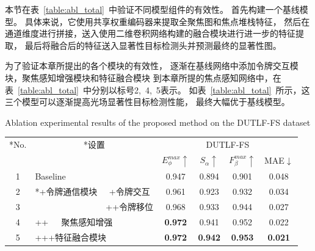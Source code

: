 本节在表~\ref{table:abl_total}~中验证不同模型组件的有效性。
首先构建一个基线模型。 
具体来说，它使用共享权重编码器来提取全聚焦图和焦点堆栈特征，
然后在通道维度进行拼接，送入使用二维卷积网络构建的融合模块进行进一步的特征提取，
最后将融合后的特征送入显著性目标检测头并预测最终的显著性图。 




为了验证本章所提出的各个模块的有效性，
逐渐在基线网络中添加令牌交互模块，聚焦感知增强模块和特征融合模块
到本章所提的焦点感知网络中，在表~\ref{table:abl_total}~中分别以标号2,~4,~5表示。
如表~\ref{table:abl_total}~所示，这三个模型可以逐渐提高光场显著性目标检测性能，
最终大幅优于基线模型。 



\begin{table}[b]
	{Ablation experimental results of the proposed method on the DUTLF-FS dataset}
	\centering
	\label{table:abl_total}
	\label{chpt3:table:abl_total}
		\begin{tabular}{cllcccc}
			\toprule[2pt]  %
			
			\multicolumn{1}{c}{ \multirow{2}*{No.}} 
			& \multicolumn{2}{c}{ \multirow{2}*{设置}}	
			& \multicolumn{4}{c}{DUTLF-FS} \\
			
			\cmidrule(r){4-7} 
			
			& & & $E_{\phi}^{max}\uparrow$ & $S_{\alpha }\uparrow $ & $F_{\beta}^{max}\uparrow$ & MAE$\downarrow$ \\
			
			
			\midrule
			
			1 & \multicolumn{2}{l}{ Baseline }     & 0.947 & 0.894 & 0.901 & 0.048 \\ 
			
			
			\midrule
			
			2 & \multicolumn{1}{l}{ \multirow{2}*{+令牌通信模块}}	
			
			& \multicolumn{1}{c}{+令牌交互}  & 0.961 & 0.923 & 0.932 & 0.034 \\ 
			3 & & \multicolumn{1}{c}{++令牌移位} & 0.968 & 0.933 & 0.944 & 0.027 \\
			
			\midrule
			
			4 & \multicolumn{2}{l}{++~~~聚焦感知增强} 		
			& \textbf{0.972} & 0.941 & 0.952 & 0.022 \\
			
			5 & \multicolumn{2}{l}{+++特征融合模块} 		
			& \textbf{0.972} & \textbf{0.942} & \textbf{0.953} & \textbf{0.021} \\ 
			
			
			\bottomrule[2pt]
		\end{tabular}
\end{table}




